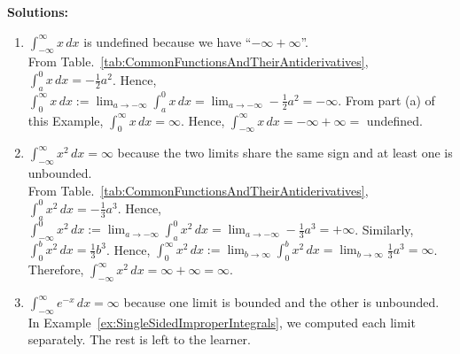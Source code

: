 \textbf{Solutions:} 

 \begin{enumerate}
\renewcommand{\labelenumi}{(\alph{enumi})}
\setlength{\itemsep}{.2cm}
   

    \item \Ans \quad $\int_{-\infty}^\infty x \, dx$ is undefined because we have ``$-\infty + \infty$''.\\

      From Table.~\ref{tab:CommonFunctionsAndTheirAntiderivatives}, $\int_a^0x \, dx = -\frac{1}{2} a^2$. Hence,  $\int_0 ^\infty x \, dx :=\displaystyle \lim_{a \to -\infty} \int_a^0 x \, dx = \lim_{a \to -\infty} -\frac{1}{2} a^2 = -\infty$. From part (a) of this Example, $\int_0 ^\infty x \, dx = \infty$. Hence, $\int_{-\infty} ^\infty x \, dx = -\infty + \infty =$ undefined.

    \item \Ans \quad $\int_{-\infty}^\infty x^2 \, dx = \infty$ because the two limits share the same sign and at least one is unbounded.\\

    From Table.~\ref{tab:CommonFunctionsAndTheirAntiderivatives}, $\int_a^0 x^2 \, dx = -\frac{1}{3} a^3$. Hence,  $\int_{-\infty} ^0 x^2 \, dx :=\displaystyle \lim_{a \to -\infty} \int_a^0 x^2 \, dx = \lim_{a \to -\infty} -\frac{1}{3} a^3 = +\infty$. Similarly,  $\int_0^b x^2 \, dx = \frac{1}{3} b^3$. Hence,  $\int_0 ^\infty x^2 \, dx :=\displaystyle \lim_{b \to \infty} \int_0^b x^2 \, dx = \lim_{b \to \infty} \frac{1}{3} a^3 = \infty$. Therefore, $\int_{-\infty} ^\infty x^2 \, dx  = \infty + \infty = \infty$.

  

    \item \Ans \quad $\int_{-\infty}^\infty e^{-x} \, dx = \infty$ because one limit is bounded and the other is unbounded.\\

    In Example~\ref{ex:SingleSidedImproperIntegrals}, we computed each limit separately. The rest is left to the learner. \Qed

\end{enumerate}

\vspace*{0.5cm} 


